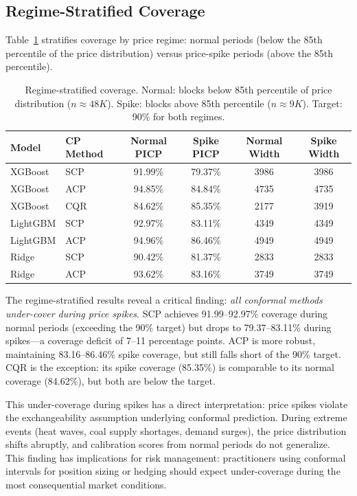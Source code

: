 \documentclass[preprint,12pt]{elsarticle}
\begin{document}
\begin{enumerate}
\subsection{Regime-Stratified Coverage}\label{sec:regime}

Table~\ref{tab:regime} stratifies coverage by price regime: normal periods (below the 85th percentile of the price distribution) versus price-spike periods (above the 85th percentile).

\begin{table}[t]
\centering
\caption{Regime-stratified coverage. Normal: blocks below 85th percentile of price distribution ($n \approx 48K$). Spike: blocks above 85th percentile ($n \approx 9K$). Target: 90\% for both regimes.}
\label{tab:regime}
\begin{tabular}{llcccc}
\toprule
\textbf{Model} & \textbf{CP Method} & \textbf{Normal PICP} & \textbf{Spike PICP} & \textbf{Normal Width} & \textbf{Spike Width} \\
\midrule
XGBoost  & SCP  & 91.99\% & 79.37\% & 3986 & 3986 \\
XGBoost  & ACP  & 94.85\% & 84.84\% & 4735 & 4735 \\
XGBoost  & CQR  & 84.62\% & 85.35\% & 2177 & 3919 \\
LightGBM & SCP  & 92.97\% & 83.11\% & 4349 & 4349 \\
LightGBM & ACP  & 94.96\% & 86.46\% & 4949 & 4949 \\
Ridge    & SCP  & 90.42\% & 81.37\% & 2833 & 2833 \\
Ridge    & ACP  & 93.62\% & 83.16\% & 3749 & 3749 \\
\bottomrule
\end{tabular}
\end{table}

The regime-stratified results reveal a critical finding: \emph{all conformal methods under-cover during price spikes}. SCP achieves 91.99--92.97\% coverage during normal periods (exceeding the 90\% target) but drops to 79.37--83.11\% during spikes---a coverage deficit of 7--11 percentage points. ACP is more robust, maintaining 83.16--86.46\% spike coverage, but still falls short of the 90\% target. CQR is the exception: its spike coverage (85.35\%) is comparable to its normal coverage (84.62\%), but both are below the target.

This under-coverage during spikes has a direct interpretation: price spikes violate the exchangeability assumption underlying conformal prediction. During extreme events (heat waves, coal supply shortages, demand surges), the price distribution shifts abruptly, and calibration scores from normal periods do not generalize. This finding has implications for risk management: practitioners using conformal intervals for position sizing or hedging should expect under-coverage during the most consequential market conditions.


\end{enumerate}
\end{document}
